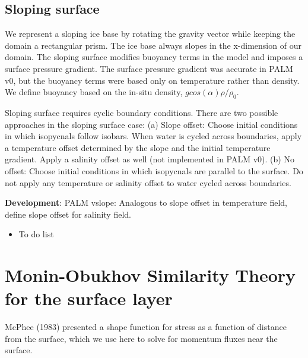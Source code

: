 \documentclass[letterpaper,10pt]{report}
\newcommand{\code}[1]{\texttt{#1}} %
\begin{document}
	
	\subsection{Sloping surface}
	We represent a sloping ice base by rotating the gravity vector while keeping the domain a rectangular prism. The ice base always slopes in the x-dimension of our domain. The sloping surface modifies buoyancy terms in the model and imposes a surface pressure gradient. The surface pressure gradient was accurate in PALM v0, but the buoyancy terms were based only on temperature rather than density. We define buoyancy based on the in-situ density, $g cos(\alpha) \rho/\rho_0$.
		
	Sloping surface requires cyclic boundary conditions. There are two possible approaches in the sloping surface case:
	(a) Slope offset: Choose initial conditions in which isopycnals follow isobars. When water is cycled across boundaries, apply a temperature offset determined by the slope and the initial temperature gradient. Apply a salinity offset as well (not implemented in PALM v0).
	(b) No offset: Choose initial conditions in which isopycnals are parallel to the surface. Do not apply any temperature or salinity offset to water cycled across boundaries.  
	
	\textbf{Development}:
	PALM vslope: Analogous to slope offset in temperature field, define slope offset for salinity field.
	\begin{itemize}
		\item To do list
	\end{itemize}
			
	\section{Monin-Obukhov Similarity Theory for the surface layer}
    McPhee (1983) presented a shape function for stress as a function of distance from the surface, which we use here to solve for momentum fluxes near the surface. 
    
\end{document}
